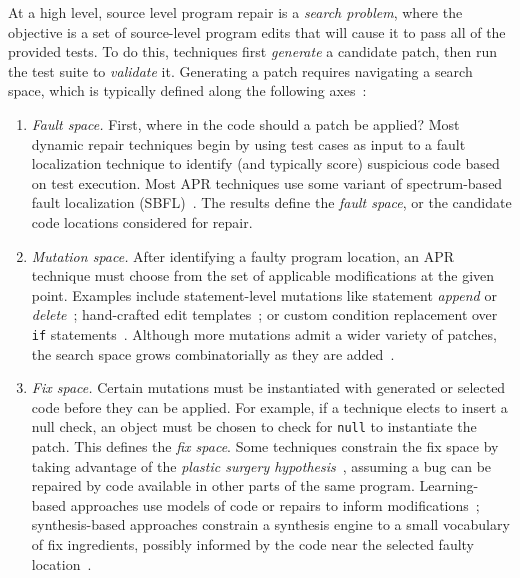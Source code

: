 \documentclass[10pt, conference]{IEEEtran}
\begin{document}
At a high level, source level program repair is a \emph{search problem}, where
the objective is a set of source-level program edits that will cause it to pass
all of the provided tests. To do this, techniques first \emph{generate} a candidate
patch, then run the test suite to \emph{validate} it. Generating a patch
requires navigating a search space, which is typically defined along the
following axes~\cite{ae,sqjo}:
\begin{enumerate}[wide]

\item \emph{Fault space.} First, where 
  in the code should a patch be applied? Most dynamic repair
  techniques begin by using test cases as input to a fault localization
  technique to identify (and typically score) suspicious code
  based on test execution. Most APR techniques
  use some variant of spectrum-based fault localization (SBFL)~\cite{ochiai}. 
  The results define the \emph{fault space}, or the
  candidate code locations considered for repair.

\item \emph{Mutation space.} After identifying a faulty program location, an APR
  technique must choose from the set of applicable modifications at the given
  point. Examples include statement-level mutations like statement \emph{append}
  or \emph{delete}~\cite{genprog-operators}; hand-crafted edit
  templates~\cite{par}; or custom condition
  replacement over \texttt{if} statements~\cite{Xuan17}. Although more mutations
  admit a wider variety of patches, the search space grows combinatorially as
  they are added~\cite{long-search-spaces}.

\item \emph{Fix space.} Certain mutations must be instantiated with generated or
  selected code before they can be applied. For example, if a technique elects
  to insert a null check, an object must be chosen to check for 
  \texttt{null} to instantiate the patch. This defines
  the \emph{fix space}. Some techniques
  constrain the fix space by taking advantage of the \emph{plastic surgery
    hypothesis}~\cite{plastic}, assuming a bug can be repaired by code
  available in other parts of the same program. Learning-based
  approaches use models of code or repairs to inform
  modifications~\cite{prophet}; synthesis-based approaches constrain a
  synthesis engine to a small vocabulary of fix ingredients, possibly informed
  by the code near the selected faulty location~\cite{angelix,s3}.


\end{enumerate}
\end{document}
